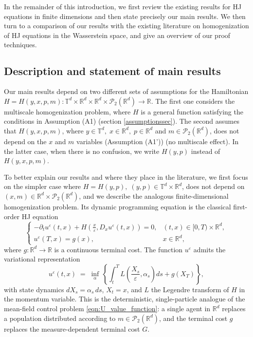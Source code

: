 \documentclass[reqno,11pt]{amsart}
\numberwithin{equation}{section}
\newcommand{\be}{\begin{equation}}
\newcommand{\ee}{\end{equation}}
\newcommand{\zd}[1]{{\color{brown}[ZD:#1]}}
\newcommand{\R}{\mathbb{R}} %
\newcommand{\e}{\varepsilon}
\newcommand{\T}{\mathbb{T}}
\newcommand{\nd}{\noindent}
\begin{document}
    \nd
    In the remainder of this introduction, we first review the existing results for HJ equations in finite dimensions and then state precisely our main results. We then turn to a comparison of our results with the existing literature on homogenization of HJ equations in the Wasserstein space, and give an overview of our proof techniques.

    \subsection{Description and statement of main results} Our main results depend on two different sets of assumptions for the Hamiltonian $H=H(y,x,p,m)\colon \T^d\times\R^d\times\R^d\times \mathcal{P}_2(\R^d)\to \R$.
    The first one considers the multiscale homogenization problem, where $H$ is a general function satisfying the conditions in Assumption (A1)
    (section \ref{assumptionssec}). The second assumes that $H(y,x,p,m)$, where $y\in\T^d,\; x\in \R^d,\; p\in \R^d$ and $m\in \mathcal{P}_2(\R^d)$, does not depend on the $x$ and $m$ variables (Assumption (A1')) (no multiscale effect). In the latter case, when there is no confusion, we write $H(y,p)$ instead of $H(y,x,p,m)$.
    \vspace{2mm}

    \nd
\nd
To better explain our results and where they place in the literature, we
first focus on the simpler case where $H=H(y,p),\; (y,p)\in \T^d\times \R^d$, does not depend on $(x,m)\in \R^d\times \mathcal{P}_2(\R^d)$,
and we describe the analogous finite-dimensional homogenization problem. Its dynamic programming equation is the classical first-order HJ equation
\be\label{fdHJBe}
\begin{cases}
    -\partial_tu^\e(t,x)+H\left(\frac{x}{\e},D_xu^\e(t,x)\right)=0,&(t,x)\in [0,T)\times\R^d,\\
    u^\e(T,x)=g(x),& x\in \R^d,
\end{cases}
\ee
where $g\colon \R^d\to \R$ is a continuous terminal cost. The function
$u^\e$ admits the variational representation
\[
u^\e(t,x)\;=\;\inf_{\alpha}\,
\left\{\int_t^T L\!\left(\frac{X_s}{\e},\alpha_s\right)ds+g(X_T)\right\},
\]
with state dynamics $dX_s=\alpha_s\,ds$, $X_t=x$, and $L$ the Legendre
transform of $H$ in the momentum variable. This is the deterministic,
single-particle analogue of the mean-field control problem
\eqref{eqn:U_value_function}: a single agent in $\R^d$ replaces a population
distributed according to $m\in\mathcal{P}_2(\R^d)$, and the terminal cost
$g$ replaces the measure-dependent terminal cost $G$.
\vspace{2mm}
\end{document}

